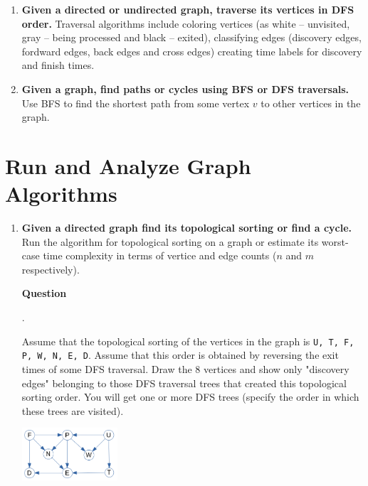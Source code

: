 \documentclass[a4paper,12pt]{article}
\newcounter{mcounter}
\newcommand\showmcounter{\addtocounter{mcounter}{1}\themcounter}
\begin{document}
{\begin{enumerate}[label=1.\Alph*.]
Write the estimates for $maxlen(Q')$, $maxchildren(T')$, $height(T')$, if we know the parameters
$maxlen(Q)$, $maxchildren(T)$, and $height(T)$.





\item {\bf Given a directed or undirected graph, traverse its vertices in DFS order.}
{\footnotesize Traversal algorithms include coloring vertices (as white -- unvisited, gray -- being processed and 
black -- exited), classifying edges (discovery edges, fordward edges, back edges and cross edges)
creating time labels for discovery and finish times.}




\item {\bf Given a graph, find paths or cycles using BFS or DFS traversals.}
{\footnotesize 
Use BFS to find the shortest path from some vertex $v$ to other vertices in the graph.
}
\end{enumerate}












\section{Run and Analyze Graph Algorithms}
\setcounter{mcounter}{0}


\begin{enumerate}[label=2.\Alph*.]
\item {\bf Given a directed graph find its topological sorting or find a cycle.}
Run the algorithm for topological sorting on a graph or estimate its worst-case time complexity
in terms of vertice and edge counts ($n$ and $m$ respectively).

\vspace{10pt}
{\bf Question \showmcounter.} 
Assume that the topological sorting of the vertices in the graph is {\tt U, T, F, P, W, N, E, D}. 
Assume that this order is obtained by reversing the exit times of some DFS traversal. 
Draw the $8$ vertices and show only "discovery edges" belonging to those DFS traversal trees that created this
topological sorting order. You will get one or more DFS trees (specify the order in which these trees are visited). 

\begin{center}
\includegraphics[width=1.4in]{ds-exam3/topological-sort.png}
\end{center}


\end{enumerate}}
\end{document}
